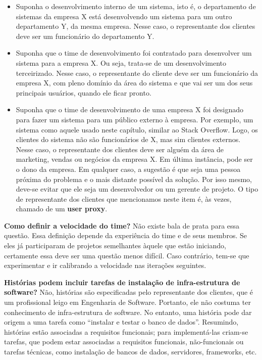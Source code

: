 \documentclass[
  11pt,
  twoside]{book}
\begin{document}
\begin{itemize}
\item
  Suponha o desenvolvimento interno de um sistema, isto é, o
  departamento de sistemas da empresa X está desenvolvendo um sistema
  para um outro departamento Y, da mesma empresa. Nesse caso, o
  representante dos clientes deve ser um funcionário do departamento Y.
\item
  Suponha que o time de desenvolvimento foi contratado para desenvolver
  um sistema para a empresa X. Ou seja, trata-se de um desenvolvimento
  terceirizado. Nesse caso, o representante do cliente deve ser um
  funcionário da empresa X, com pleno domínio da área do sistema e que
  vai ser um dos seus principais usuários, quando ele ficar pronto.
\item
  Suponha que o time de desenvolvimento de uma empresa X foi designado
  para fazer um sistema para um público externo à empresa. Por exemplo,
  um sistema como aquele usado neste capítulo, similar ao Stack
  Overflow. Logo, os clientes do sistema não são funcionários de X, mas
  sim clientes externos. Nesse caso, o representante dos clientes deve
  ser alguém da área de marketing, vendas ou negócios da empresa X. Em
  última instância, pode ser o dono da empresa. Em qualquer caso, a
  sugestão é que seja uma pessoa próxima do problema e o mais distante
  possível da solução. Por isso mesmo, deve-se evitar que ele seja um
  desenvolvedor ou um gerente de projeto. O tipo de representante dos
  clientes que mencionamos neste item é, às vezes, chamado de um
  \textbf{user proxy}.
\end{itemize}

  \textbf{Como
definir a velocidade do time?} Não existe bala de prata para essa
questão. Essa definição depende da experiência do time e de seus
membros. Se eles já participaram de projetos semelhantes àquele que
estão iniciando, certamente essa deve ser uma questão menos difícil.
Caso contrário, tem-se que experimentar e ir calibrando a velocidade nas
iterações seguintes.

\textbf{Histórias podem incluir tarefas de instalação de infra-estrutura
de software?} Não, histórias são especificadas pelo representante dos
clientes, que é um profissional leigo em Engenharia de Software.
Portanto, ele não costuma ter conhecimento de infra-estrutura de
software. No entanto, uma história pode dar origem a uma tarefa como
``instalar e testar o banco de dados''. Resumindo, histórias estão
associadas a requisitos funcionais; para implementá-las criam-se
tarefas, que podem estar associadas a requisitos funcionais,
não-funcionais ou tarefas técnicas, como instalação de bancos de dados,
servidores, frameworks, etc.
\end{document}
